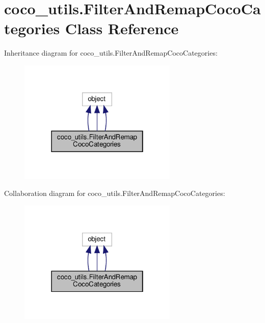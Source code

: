 \hypertarget{classcoco__utils_1_1FilterAndRemapCocoCategories}{}\section{coco\+\_\+utils.\+Filter\+And\+Remap\+Coco\+Categories Class Reference}
\label{classcoco__utils_1_1FilterAndRemapCocoCategories}


Inheritance diagram for coco\+\_\+utils.\+Filter\+And\+Remap\+Coco\+Categories\+:
\nopagebreak
\begin{figure}[H]
\begin{center}
\leavevmode
\includegraphics[width=214pt]{classcoco__utils_1_1FilterAndRemapCocoCategories__inherit__graph}
\end{center}
\end{figure}


Collaboration diagram for coco\+\_\+utils.\+Filter\+And\+Remap\+Coco\+Categories\+:
\nopagebreak
\begin{figure}[H]
\begin{center}
\leavevmode
\includegraphics[width=214pt]{classcoco__utils_1_1FilterAndRemapCocoCategories__coll__graph}
\end{center}
\end{figure}
